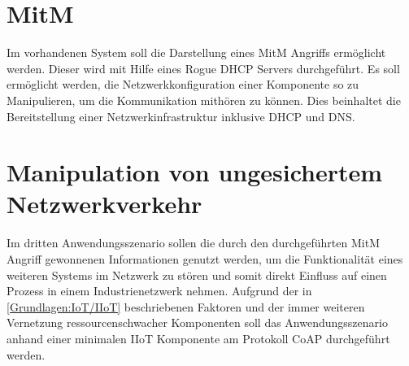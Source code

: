 \section{\ac{MitM}}
\label{Anwendungsszenarien:MitM}
Im vorhandenen System soll die Darstellung eines \ac{MitM} Angriffs ermöglicht werden. Dieser wird mit Hilfe eines Rogue \ac{DHCP} Servers durchgeführt. Es soll ermöglicht werden, die Netzwerkkonfiguration einer Komponente so zu Manipulieren, um die Kommunikation mithören zu können. Dies beinhaltet die Bereitstellung einer Netzwerkinfrastruktur inklusive \ac{DHCP} und \ac{DNS}.

\section{Manipulation von ungesichertem Netzwerkverkehr}
\label{Anwendungsszenarien:Manipulation von ungesichertem Netzwerkverkehr}
Im dritten Anwendungsszenario sollen die durch den durchgeführten \ac{MitM} Angriff gewonnenen Informationen genutzt werden, um die Funktionalität eines weiteren Systems im Netzwerk zu stören und somit direkt Einfluss auf einen Prozess in einem Industrienetzwerk nehmen. Aufgrund der in \autoref{Grundlagen:IoT/IIoT} beschriebenen Faktoren und der immer weiteren Vernetzung ressourcenschwacher Komponenten soll das Anwendungsszenario anhand einer minimalen \ac{IIoT} Komponente am Protokoll \ac{CoAP} durchgeführt werden.